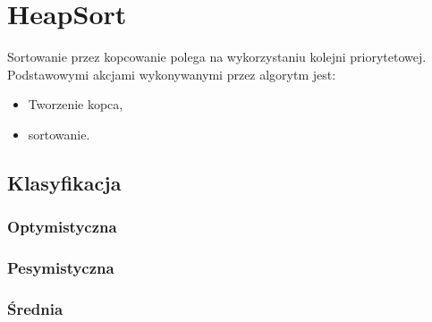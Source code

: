 \section{HeapSort}
Sortowanie przez kopcowanie polega na wykorzystaniu kolejni priorytetowej. Podstawowymi akcjami wykonywanymi przez algorytm jest:
\begin{itemize}
\item Tworzenie kopca,
\item sortowanie.
\end{itemize}
\subsection{Klasyfikacja}
\subsubsection{Optymistyczna}

\subsubsection{Pesymistyczna}


\subsubsection{Średnia}
